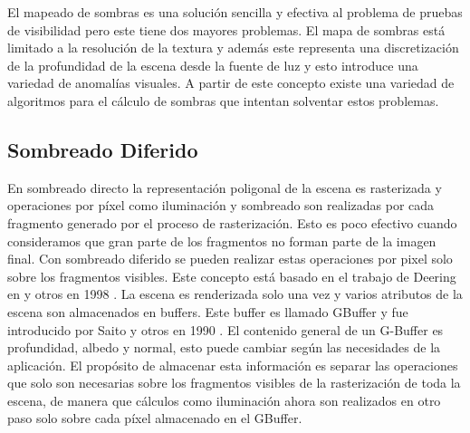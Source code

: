 El mapeado de sombras es una solución sencilla y efectiva al problema de pruebas de visibilidad pero este tiene dos mayores problemas. El mapa de sombras está limitado a la resolución de la textura y además este representa una discretización de la profundidad de la escena desde la fuente de luz y esto introduce una variedad de anomalías visuales. A partir de este concepto existe una variedad de algoritmos para el cálculo de sombras que intentan solventar estos problemas.
\subsection{Sombreado Diferido}
En sombreado directo la representación poligonal de la escena es rasterizada y operaciones por píxel como iluminación y sombreado son realizadas por cada fragmento generado por el proceso de rasterización. Esto es poco efectivo cuando consideramos que gran parte de los fragmentos no forman parte de la imagen final.
Con sombreado diferido se pueden realizar estas operaciones por pixel solo sobre los fragmentos visibles. Este concepto está basado en el trabajo de Deering en y otros en 1998 \cite{Deering:1988}. La escena es renderizada solo una vez y varios atributos de la escena son almacenados en buffers. Este buffer es llamado \ac{GBuffer} y fue introducido por Saito y otros en 1990 \cite{Saito:1990}. El contenido general de un G-Buffer es profundidad, albedo y normal, esto puede cambiar según las necesidades de la aplicación. El propósito de almacenar esta información es separar las operaciones que solo son necesarias sobre los fragmentos visibles de la rasterización de toda la escena, de manera que cálculos como iluminación ahora son realizados en otro paso solo sobre cada píxel almacenado en el \ac{GBuffer}.

